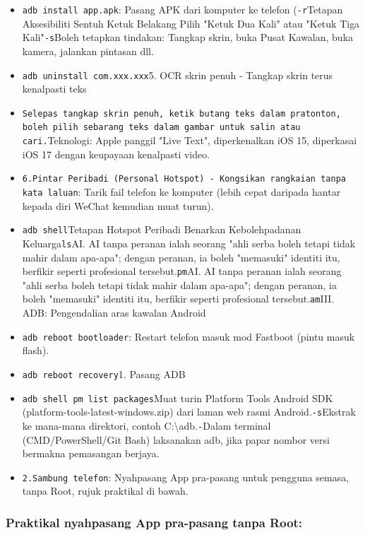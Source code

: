 \begin{itemize}
  \item \texttt{adb install app.\allowbreak apk}: Pasang APK dari komputer ke telefon (\texttt{-\allowbreak r}Tetapan Aksesibiliti Sentuh Ketuk Belakang Pilih "Ketuk Dua Kali" atau "Ketuk Tiga Kali"\texttt{-\allowbreak s}Boleh tetapkan tindakan: Tangkap skrin, buka Pusat Kawalan, buka kamera, jalankan pintasan dll.
  \item \texttt{adb uninstall com.\allowbreak xxx.\allowbreak xxx}5. OCR skrin penuh ‑ Tangkap skrin terus kenalpasti teks
  \item \texttt{Selepas tangkap skrin penuh, ketik butang teks dalam pratonton, boleh pilih sebarang teks dalam gambar untuk salin atau cari.\allowbreak }Teknologi: Apple panggil "Live Text", diperkenalkan iOS 15, diperkasai iOS 17 dengan keupayaan kenalpasti video.
  \item \texttt{6.\allowbreak  Pintar Peribadi (Personal Hotspot) ‑ Kongsikan rangkaian tanpa kata laluan}: Tarik fail telefon ke komputer (lebih cepat daripada hantar kepada diri WeChat kemudian muat turun).
  \item \texttt{adb shell}Tetapan Hotspot Peribadi Benarkan Kebolehpadanan Keluarga\texttt{ls}AI. AI tanpa peranan ialah seorang "ahli serba boleh tetapi tidak mahir dalam apa-apa"; dengan peranan, ia boleh "memasuki" identiti itu, berfikir seperti profesional tersebut.\texttt{pm}AI. AI tanpa peranan ialah seorang "ahli serba boleh tetapi tidak mahir dalam apa-apa"; dengan peranan, ia boleh "memasuki" identiti itu, berfikir seperti profesional tersebut.\texttt{am}III. ADB: Pengendalian aras kawalan Android
  \item \texttt{adb reboot bootloader}: Restart telefon masuk mod Fastboot (pintu masuk flash).
  \item \texttt{adb reboot recovery}1. Pasang ADB
  \item \texttt{adb shell pm list packages}Muat turin Platform Tools Android SDK (platform-tools-latest-windows.zip) dari laman web rasmi Android.\texttt{-\allowbreak s}Ekstrak ke mana-mana direktori, contoh C:\textbackslash{}adb.\texttt{-}Dalam terminal (CMD/PowerShell/Git Bash) laksanakan adb, jika papar nombor versi bermakna pemasangan berjaya.
  \item \texttt{2.\allowbreak  Sambung telefon}: Nyahpasang App pra-pasang untuk pengguna semasa, tanpa Root, rujuk praktikal di bawah.
\end{itemize}

\subsubsection*{Praktikal nyahpasang App pra-pasang tanpa Root:}

